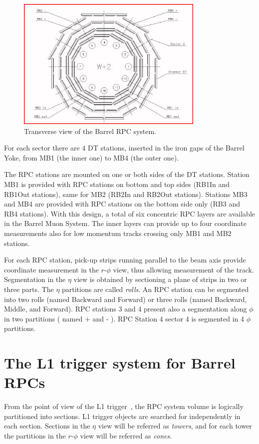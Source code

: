 \begin{figure}[hbtp]
  \begin{center}
    \includegraphics[width=0.8\textwidth]{barrel_layout}
    \hspace{1cm}
    \caption{Transverse view of the Barrel RPC system.}
    \label{fig:barrel_lay}
  \end{center}
\end{figure}

For each sector there are 4 DT stations, inserted in the 
iron gaps of the Barrel Yoke, from MB1 (the inner one)
to MB4 (the outer one). 

The RPC stations are mounted on one or both sides of the DT 
stations. Station MB1 is provided with RPC stations on 
bottom and top sides (RB1In and RB1Out stations), same 
for MB2 (RB2In and RB2Out stations). Stations MB3 and MB4
are provided with RPC stations on the bottom side only
(RB3 and RB4 stations). 
With this design, a total of six concentric RPC layers are 
available in the Barrel Muon System. The inner
layers can provide up to four coordinate measurements also for 
low momentum tracks crossing only MB1 and MB2 stations.

For each RPC station, pick-up strips running parallel to the 
beam axis provide coordinate measurement in the $r$-$\phi$ view,
thus allowing \pt measurement of the track. 
Segmentation in the $\eta$ view is obtained by sectioning
a plane of strips in two or three parts. 
The $\eta$ partitions are called {\em rolls}.
An RPC station can be segmented into two rolls (named Backward and 
Forward) or three rolls (named Backward, Middle, and Forward).
RPC stations 3 and 4 present also a segmentation along $\phi$ in two 
partitions ( named + and - ). RPC Station 4 sector 4 is segmented in 4 $\phi$ partitions.

\section{The L1 trigger system for Barrel RPCs}
From the point of view of the L1 trigger~\cite{ref:trig_tdr}, 
the RPC system volume is logically partitioned into 
sections. L1 trigger objects are searched 
for independently in each section.
Sections in the $\eta$ view will be referred as {\em towers},
and for each tower the partitions in  
the $r$-$\phi$ view will be referred as {\em cones}.


